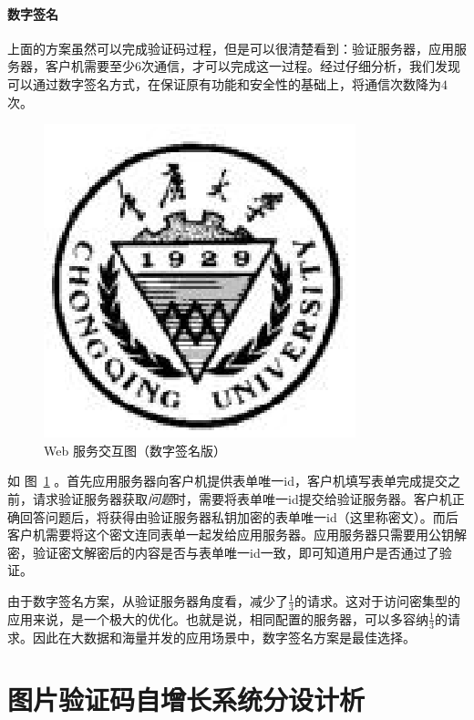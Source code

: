 \documentclass[bachelor,zhspacing]{cqu}  %
\begin{document}
\paragraph{数字签名}\label{ux6570ux5b57ux7b7eux540d}

上面的方案虽然可以完成验证码过程，但是可以很清楚看到：验证服务器，应用服务器，客户机需要至少\(6\)次通信，才可以完成这一过程。经过仔细分析，我们发现可以通过数字签名方式，在保证原有功能和安全性的基础上，将通信次数降为\(4\)次。

\begin{figure}[htbp]
\centering
\includegraphics{pic/cqu.eps}
\caption{Web
服务交互图（数字签名版）}\label{fig:digital-signature-interaction}
\end{figure}

如 图~\ref{fig:digital-signature-interaction}
。首先应用服务器向客户机提供表单唯一id，客户机填写表单完成提交之前，请求验证服务器获取\emph{问题}时，需要将表单唯一id提交给验证服务器。客户机正确回答问题后，将获得由验证服务器私钥加密的表单唯一id（这里称密文）。而后客户机需要将这个密文连同表单一起发给应用服务器。应用服务器只需要用公钥解密，验证密文解密后的内容是否与表单唯一id一致，即可知道用户是否通过了验证。

由于数字签名方案，从验证服务器角度看，减少了\(\frac{1}{3}\)的请求。这对于访问密集型的应用来说，是一个极大的优化。也就是说，相同配置的服务器，可以多容纳\(\frac{1}{3}\)的请求。因此在大数据和海量并发的应用场景中，数字签名方案是最佳选择。

\section{图片验证码自增长系统分设计析}\label{ux56feux7247ux9a8cux8bc1ux7801ux81eaux589eux957fux7cfbux7edfux5206ux8bbeux8ba1ux6790}
\end{document}
